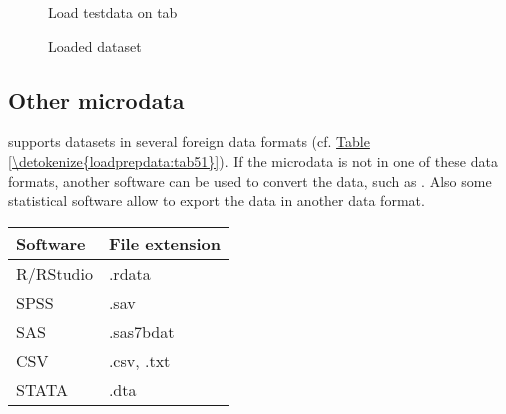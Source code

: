 \documentclass[letterpaper,10pt,english]{sphinxmanual}
\begin{document}
\begin{figure}[htbp]
\centering
\capstart

\noindent{}
\caption{Load testdata on  tab}\label{\detokenize{loadprepdata:fig51}}\label{\detokenize{loadprepdata:id1}}\end{figure}

\begin{figure}[htbp]
\centering
\capstart

\noindent{}
\caption{Loaded dataset}\label{\detokenize{loadprepdata:fig52}}\label{\detokenize{loadprepdata:id2}}\end{figure}


\subsection{Other microdata}
\label{\detokenize{loadprepdata:other-microdata}}
 supports datasets in several foreign data formats (cf. \hyperref[\detokenize{loadprepdata:tab51}]{Table \ref{\detokenize{loadprepdata:tab51}}}).
If the microdata is not in one of these data formats, another software can be used
to convert the data, such as . Also some statistical software allow to export
the data in another data format.


\begin{savenotes}\sphinxattablestart
\centering
{}
\label{\detokenize{loadprepdata:tab51}}\label{\detokenize{loadprepdata:id3}}
\sphinxaftercaption
\begin{tabulary}{\linewidth}[t]{|T|T|}
\hline
\sphinxstyletheadfamily 
Software
&\sphinxstyletheadfamily 
File extension
\\
\hline
R/RStudio
&
.rdata
\\
\hline
SPSS
&
.sav
\\
\hline
SAS
&
.sas7bdat
\\
\hline
CSV
&
.csv, .txt
\\
\hline
STATA
&
.dta
\\
\hline
\end{tabulary}
\par
\sphinxattableend\end{savenotes}
\end{document}

